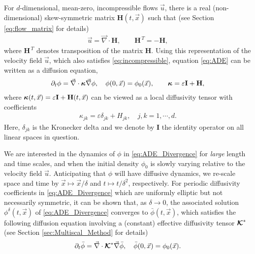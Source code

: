 \documentclass[11pt]{amsart}
\newcommand{\Hb}{\mathbf{H}}
\newcommand{\Ib}{\mathbf{I}}
\newcommand\Kbc{\mbox{\boldmath${\mathcal{K}}$}}
\newcommand\bkappa{\mbox{\boldmath${\kappa}$}}
\begin{document}
For $d$-dimensional, mean-zero, incompressible flows $\vec{u}$, there
is a real (non-dimensional) skew-symmetric 
matrix $\Hb(t,\vec{x})$ such that (see Section \ref{eq:flow_matrix}
for details) 
\begin{align}\label{eq:u_DH}
 \vec{u}=\vec{\nabla}\cdot\Hb, \qquad  \Hb^{\,T}=-\Hb,
\end{align}
where $\Hb^{\,T}$ denotes transposition of the matrix $\Hb$.
Using this representation of the velocity field $\vec{u}$, which also
satisfies \eqref{eq:incompressible}, equation \eqref{eq:ADE} can be
written as a diffusion equation,  
%
\begin{align}\label{eq:ADE_Divergence}
  \partial_t\phi%
    =\vec{\nabla}\cdot\bkappa\vec{\nabla}\phi, \quad
    \phi(0,\vec{x})=\phi_0(\vec{x}),
    \qquad
    \bkappa=\varepsilon\Ib+\Hb,
\end{align}
%
where $\bkappa(t,\vec{x})=\varepsilon\Ib+\Hb(t,\vec{x})$ can be viewed as a local
diffusivity tensor with coefficients
%
\begin{align}\label{eq:kappa_coeff}
  \kappa_{jk}=\varepsilon\delta_{jk}+H_{jk},\quad j,k=1,\cdots,d.
\end{align}
%
Here, $\delta_{jk}$ is the Kronecker delta and we denote by $\Ib$ the
identity operator on all linear spaces in question.    






We are interested in the dynamics of $\phi$ in \eqref{eq:ADE_Divergence}
for \emph{large} length and time scales, and when the initial density
$\phi_0$ is slowly varying relative to the velocity field
$\vec{u}$. Anticipating that $\phi$ will have diffusive dynamics, we
re-scale space and time by $\vec{x}\mapsto\vec{x}/\delta$ and $t\mapsto t/\delta^2$,
respectively.  For periodic diffusivity coefficients in
\eqref{eq:ADE_Divergence} which are uniformly elliptic but not
necessarily symmetric, it can be shown \cite{Fannjiang:SIAM_JAM:333}
that, as $\delta\to0$, the associated solution $\phi^\delta(t,\vec{x})$ of
\eqref{eq:ADE_Divergence} converges to $\bar{\phi}(t,\vec{x})$,
which satisfies the following diffusion equation involving a (constant)
effective diffusivity tensor $\Kbc^*$ (see Section
\ref{sec:Multiscal_Method} for details)    
%
\begin{align}\label{eq:phi_bar}
  \partial_t\bar{\phi}=\vec{\nabla}\cdot\Kbc^*\vec{\nabla}\bar{\phi}, \quad
  \bar{\phi}(0,\vec{x})=\phi_0(\vec{x}).
\end{align}
%
\end{document}
